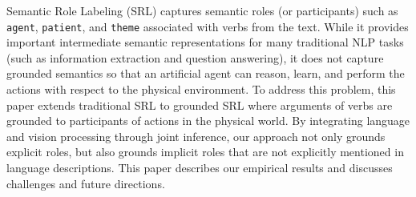 Semantic Role Labeling (SRL) captures semantic roles (or participants) such as \texttt{agent}, \texttt{patient}, and \texttt{theme} associated with verbs from the text. While it provides important intermediate semantic representations for many traditional NLP tasks (such as information extraction and question answering), it does not capture grounded semantics so that an artificial agent can reason, learn, and perform the actions with respect to the physical environment. To address this problem, this paper extends traditional SRL to grounded SRL where arguments of verbs are grounded to participants of actions in the physical world. By integrating language and vision processing through joint inference, our approach not only grounds explicit roles, but also grounds implicit roles that are not explicitly mentioned in language descriptions. This paper describes our empirical results and discusses challenges and future directions.
